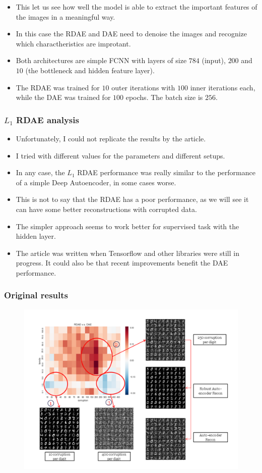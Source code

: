 \documentclass{beamer}
\theoremstyle{plain}
\theoremstyle{definition}
\theoremstyle{remark}
\begin{document}
\begin{frame}
	\begin{itemize}
		\item This let us see how well the model is able to extract the important features of the images in a meaningful way.
		\item In this case the RDAE and DAE need to denoise the images and recognize which charactheristics are improtant.
		\item Both architectures are simple FCNN with layers of size $784$ (input), $200$ and $10$ (the bottleneck and hidden feature layer).
		\item The RDAE was trained for $10$ outer iterations with $100$ inner iterations each, while the DAE was trained for $100$ epochs. The batch size is $256$.
	\end{itemize}
\end{frame}

\begin{frame}
	\frametitle{$L_1$ RDAE analysis}
	\begin{itemize}
		\item Unfortunately, I could not replicate the results by the article.
		\item I tried with different values for the parameters and different setups.
		\item In any case, the $L_1$ RDAE performance was really similar to the performance of a simple Deep Autoencoder, in some cases worse.
		\item This is not to say that the RDAE has a poor performance, as we will see it can have some better reconstructions with corrupted data.
		\item The simpler approach seems to work better for supervised task with the hidden layer.
		\item The article was written when Tensorflow and other libraries were still in progress. It could also be that recent improvements benefit the DAE performance.
	\end{itemize}
\end{frame}

\begin{frame}
	\frametitle{Original results}
	\begin{figure}
		\centering
		\includegraphics[width=0.8\linewidth]{Images/original_l1.png}
	\end{figure}
\end{frame}
\end{document}
